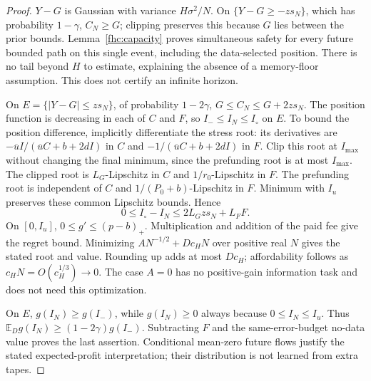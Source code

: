 \documentclass[12pt]{article}
\theoremstyle{definition}
\theoremstyle{remark}
\begin{document}
\begin{proof}
$Y-G$ is Gaussian with variance $H\sigma^2/N$. On
$\{Y-G\ge-zs_N\}$, which has probability $1-\gamma$, $C_N\ge G$;
clipping preserves this because $G$ lies between the prior bounds.
Lemma~\ref{fhc:capacity} proves simultaneous safety for every future
bounded path on this single event, including the data-selected position.
There is no tail beyond $H$ to estimate, explaining the absence of a
memory-floor assumption. This does not certify an infinite horizon.

On $E=\{|Y-G|\le zs_N\}$, of probability $1-2\gamma$,
$G\le C_N\le G+2zs_N$. The position function is decreasing in each
of $C$ and $F$, so $I_-\le I_N\le I_\circ$ on $E$.
To bound the position difference, implicitly differentiate the stress root:
its derivatives are $-\overline u I/(\overline u C+b+2dI)$ in $C$
and $-1/(\overline u C+b+2dI)$ in $F$.
Clip this root at $I_{\max}$ without changing the final minimum, since
the prefunding root is at most $I_{\max}$. The clipped root is
$L_G$-Lipschitz in $C$ and $1/r_0$-Lipschitz in $F$.
The prefunding root is independent of $C$ and
$1/(P_0+b)$-Lipschitz in $F$. Minimum with $I_u$ preserves these
common Lipschitz bounds. Hence
\[
 0\le I_\circ-I_N\le 2L_Gzs_N+L_FF.
\]
On $[0,I_u]$, $0\le g'\le(p-b)_+$. Multiplication and addition of
the paid fee give the regret bound. Minimizing
$AN^{-1/2}+Dc_HN$ over positive real $N$ gives the stated root and
value. Rounding up adds at most $Dc_H$; affordability follows as
$c_HN=O(c_H^{1/3})\to0$. The case $A=0$ has no positive-gain
information task and does not need this optimization.

On $E$, $g(I_N)\ge g(I_-)$, while $g(I_N)\ge0$ always because
$0\le I_N\le I_u$. Thus
$\mathbb E_D g(I_N)\ge(1-2\gamma)g(I_-)$.
Subtracting $F$ and the same-error-budget no-data value proves the last assertion.
Conditional mean-zero future flows justify the stated expected-profit
interpretation; their distribution is not learned from extra tapes.
\end{proof}
\end{document}
